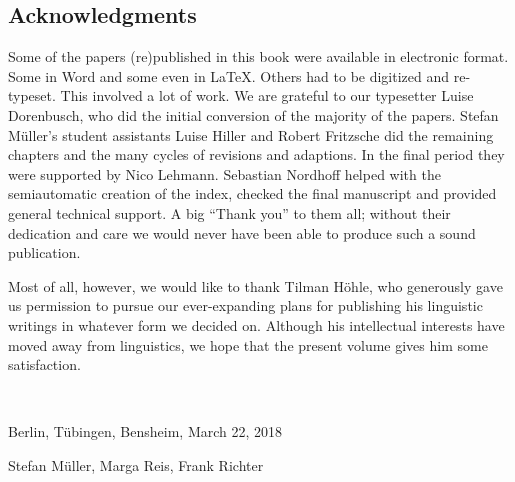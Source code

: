 \begin{refsection}
\section*{Acknowledgments}

Some of the papers (re)published in this book were available in electronic format. Some in Word and
some even in \LaTeX. Others had to be digitized and re-typeset. This involved a lot of work. We are
grateful to our typesetter Luise Dorenbusch, who did the initial conversion of the majority of the
papers. Stefan Müller's student assistants Luise Hiller and Robert Fritzsche did the remaining
chapters and the many cycles of revisions and adaptions. In the final period they were supported by
Nico Lehmann. Sebastian Nordhoff helped with the semiautomatic creation of the index, checked the
final manuscript and provided general technical support. A big ``Thank you'' to them all; without their dedication and
care we would never have been able to produce such a sound publication.


Most of all, however, we would like to thank Tilman Höhle, who generously gave us permission to pursue our ever-expanding plans for publishing his linguistic writings in whatever form we decided on. Although his intellectual interests have moved away from linguistics, we hope that the present volume gives him some satisfaction.

~\medskip

\noindent
Berlin, Tübingen, Bensheim, March 22, 2018

\hfill Stefan Müller, Marga Reis, Frank Richter


\nocite{g_Hoehle78b,g_Hoehle79,Hoehle80,Hoehle83,Hoehle86,Hoehle91,Hoehle91b,hoehle:94c,hoehle1994a-eng,hoehle94b-eng,hoehle:95,g_Hoehle96a,Hoehle97a,Hoehle99a,Hoehle06}

\label{page-hoehle-refs}
\printbibliography[heading=subbibliography,notkeyword=this]

\end{refsection}




